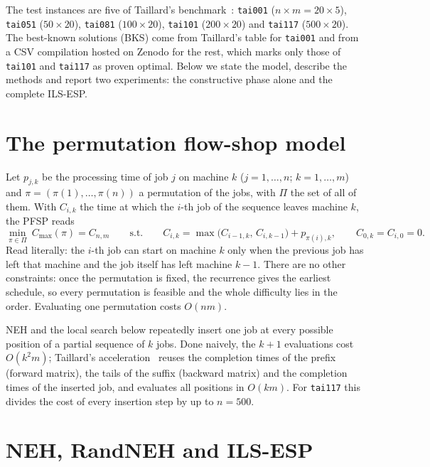 \documentclass[10pt,a4paper]{article}
\begin{document}
The test instances are five of Taillard's benchmark~\cite{taillard1993}: \texttt{tai001}
($n\times m=20\times5$), \texttt{tai051} ($50\times20$), \texttt{tai081} ($100\times20$),
\texttt{tai101} ($200\times20$) and \texttt{tai117} ($500\times20$). The best-known solutions (BKS) come from Taillard's
table for \texttt{tai001} and from a CSV compilation hosted on Zenodo for the rest, which marks only
those of \texttt{tai101} and \texttt{tai117} as proven optimal. Below we state the model, describe the methods and report two
experiments: the constructive phase alone and the complete ILS-ESP.

\section{The permutation flow-shop model}
\label{sec:model}

Let $p_{j,k}$ be the processing time of job $j$ on machine $k$ ($j=1,\dots,n$; $k=1,\dots,m$) and
$\pi=(\pi(1),\dots,\pi(n))$ a permutation of the jobs, with $\Pi$ the set of all of them. With
$C_{i,k}$ the time at which the $i$-th job of the sequence leaves machine $k$, the PFSP reads
\begin{equation}
\min_{\pi\in\Pi}\ C_{\max}(\pi)=C_{n,m}
\qquad\text{s.t.}\qquad
C_{i,k}=\max\bigl(C_{i-1,k},\,C_{i,k-1}\bigr)+p_{\pi(i),k},\qquad
C_{0,k}=C_{i,0}=0 .
\label{eq:model}
\end{equation}
Read literally: the $i$-th job can start on machine $k$ only when the previous job has left that
machine and the job itself has left machine $k-1$. There are no other constraints: once the permutation
is fixed, the recurrence gives the earliest schedule, so every permutation is feasible and the whole
difficulty lies in the order. Evaluating one permutation costs $O(nm)$.

NEH and the local search below repeatedly insert one job at every possible position of a partial sequence of $k$ jobs. Done naively, the $k+1$
evaluations cost $O(k^2m)$; Taillard's acceleration~\cite{taillard1990} reuses the completion times of
the prefix (forward matrix), the tails of the suffix (backward matrix) and the completion times of the
inserted job, and evaluates all positions in $O(km)$. For \texttt{tai117} this divides the cost of
every insertion step by up to $n=500$.

\section{NEH, RandNEH and ILS-ESP}
\label{sec:method}
\end{document}
